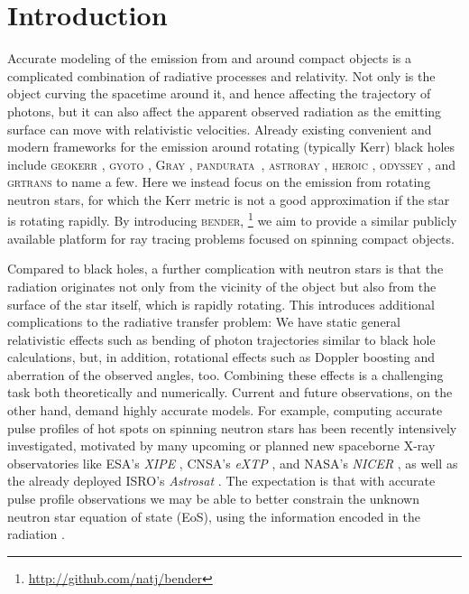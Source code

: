 \documentclass{aa}
\begin{document}
\maketitle


\section{Introduction}
Accurate modeling of the emission from and around compact objects is a complicated combination of radiative processes and relativity.
Not only is the object curving the spacetime around it, and hence affecting the trajectory of photons, but it can also affect the apparent observed radiation as the emitting surface can move with relativistic velocities.
Already existing convenient and modern frameworks for the emission around rotating (typically Kerr) black holes include \textsc{geokerr} \citep{dexter2009}, \textsc{gyoto} \citep{Vincent11}, \textsc{Gray} \citep{CPO13}, \textsc{pandurata} \citep{SK13}, \textsc{astroray} \citep{SM13}, \textsc{heroic} \citep{NZP16}, \textsc{odyssey} \citep{PYY16}, and \textsc{grtrans} \citep{dexter2016} to name a few.
Here we instead focus on the emission from rotating neutron stars, for which the Kerr metric is not a good approximation if the star is rotating rapidly.
By introducing \textsc{bender},%
\footnote{ \url{ http://github.com/natj/bender} } 
we aim to provide a similar publicly available platform for ray tracing problems focused on spinning compact objects.

Compared to black holes, a further complication with neutron stars is that the radiation originates not only from the vicinity of the object but also from the surface of the star itself, which is rapidly rotating.
This introduces additional complications to the radiative transfer problem: 
We have static general relativistic effects such as bending of photon trajectories similar to black hole calculations, but, in addition, rotational effects such as Doppler boosting and aberration of the observed angles, too.
Combining these effects is a challenging task both theoretically and numerically.
Current and future observations, on the other hand, demand highly accurate models.
For example, computing accurate pulse profiles of hot spots on spinning neutron stars has been recently intensively investigated, motivated by many upcoming or planned new spaceborne X-ray observatories like ESA's \textit{XIPE} \citep{XIPE}, CNSA's \textit{eXTP} \citep{eXTP}, and NASA's \textit{NICER} \citep{NICER}, as well as the already deployed ISRO's \textit{Astrosat} \citep{Astrosat}.
The expectation is that with accurate pulse profile observations we may be able to better constrain the unknown neutron star equation of state (EoS), using the information encoded in the radiation \citep[see e.g.,][]{LMB13}.
\end{document}
